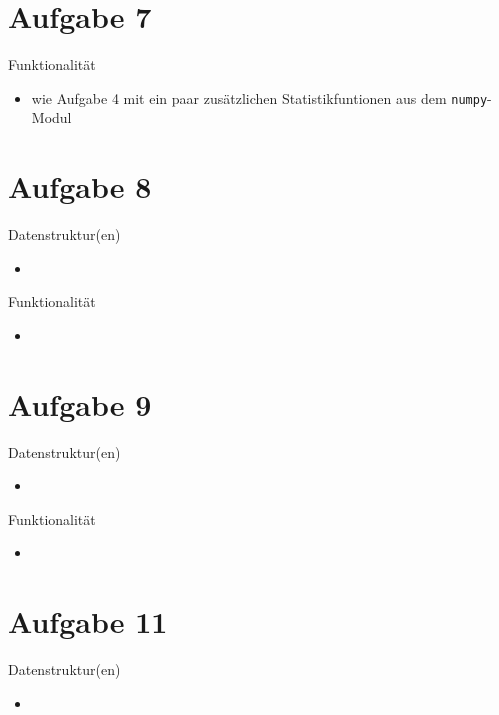 \documentclass{beamer}
\begin{document}
    \section{Aufgabe 7}
    \begin{frame}{Funktionalität}
    	\begin{itemize}
    		\setlength\itemsep{1em}
    		\item wie Aufgabe 4 mit ein paar zusätzlichen Statistikfuntionen aus dem \lstinline{numpy}-Modul
    	\end{itemize}
    \end{frame}

    \section{Aufgabe 8}
    \begin{frame}{Datenstruktur(en)}
    	\begin{itemize}
    		\setlength\itemsep{1em}
    		\item
    	\end{itemize}
    \end{frame}

    \begin{frame}{Funktionalität}
    	\begin{itemize}
    		\setlength\itemsep{1em}
    		\item
    	\end{itemize}
    \end{frame}

    \section{Aufgabe 9}
    \begin{frame}{Datenstruktur(en)}
    	\begin{itemize}
    		\setlength\itemsep{1em}
    		\item
    	\end{itemize}
    \end{frame}

    \begin{frame}{Funktionalität}
    	\begin{itemize}
    		\setlength\itemsep{1em}
    		\item
    	\end{itemize}
    \end{frame}

    \section{Aufgabe 11}
    \begin{frame}{Datenstruktur(en)}
    	\begin{itemize}
    		\setlength\itemsep{1em}
    		\item
    	\end{itemize}
    \end{frame}
\end{document}
